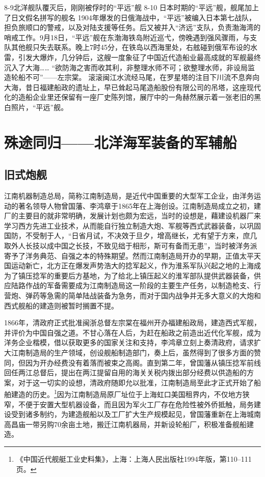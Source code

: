\documentclass[12pt,UTF8]{ctexbook}
\begin{document}
8-9北洋舰队覆灭后，刚刚被俘时的“平远”舰
8-10 日本时期的“平远”舰，舰尾加上了日文假名拼写的舰名
1904年爆发的日俄海战中，“平远”被编入日本第七战队，担负旅顺口的警戒，以及对陆支援等任务。后又被并入“济远”支队，负责渤海湾的哨戒工作。9月18日，“平远”舰在东渤海铁岛附近巡弋，傍晚遇到强风骤雨，与支队其他舰只失去联系。晚上7时45分，在铁岛以西海里处，右舷碰到俄军布设的水雷，引发大爆炸，几分钟后，这艘一度象征了中国近代造船业最高成就的军舰最终沉入了大海……
“欲防海之害而收其利，非整理水师不可；欲整理水师，非设局监造轮船不可”——左宗棠。
滚滚闽江水流经马尾，在罗星塔的注目下川流不息奔向大海，昔日福建船政的遗址上，早已耸起马尾造船股份有限公司的吊塔，这座现代化的造船企业里还保留有一座厂史陈列馆，展厅中的一角赫然展示着一张老旧的黑白照片，“平远”舰。

\chapter{殊途同归——北洋海军装备的军辅船}

\section{旧式炮舰}

江南机器制造总局，简称江南制造局，是近代中国重要的大型军工企业，由洋务运动的著名领导人物曾国藩、李鸿章于1865年在上海创设。江南制造局成立之初，建厂的主要目的就非常明确，发展计划也颇为宏远，当时的设想是，藉建设机器厂来学习西方先进工业技术，从而能自行独立制造大炮、军舰等西式武器装备，以巩固国防，不受制于人，“日省月试，不决效于旦夕，增高继长，尤有望于方来，庶几取外人长技以成中国之长技，不致见绌于相形，斯可有备而无患”，当时被洋务派寄予了洋务典范、自强之本的特殊期望。然而江南制造局开办的早期，正值太平天国运动新亡，北方正在爆发声势浩大的捻军起义，作为淮系军队兴起之地的上海成为了镇压捻军的重要后方基地，为了给北上镇压起义的淮军部队提供武器装备，供应陆路作战的军备需要成为江南制造局这一阶段的主要生产任务，以制造枪支、行营炮、弹药等急需的简单陆战装备为急务，而对于国内战争并无多大意义的大炮和西式舰船的建造则被暂时搁置不提。

1866年，清政府正式批准闽浙总督左宗棠在福州开办福建船政局，建造西式军舰，并评价为中国自强之道。不甘心落在人后，为赶在船政之前造出近代化军舰，成为洋务企业楷模，借以获取更多的国家关注和支持，李鸿章立刻上奏清政府，请求扩大江南制造局的生产领域，创设舰船制造部门，奏上后，虽然得到了很多方面的赞同，但因为开办经费没有着落而被束之高阁。直到第二年，曾国藩从镇压捻军前线回任两江总督后，提出在两江提留自用的海关关税内拨出部分经费以供造船的方案，对于这一切实的设想，清政府随即允以批准，江南制造局至此才正式开始了船舶建造的历史。\footnote{《中国近代舰艇工业史料集》，上海：上海人民出版社1994年版，第110--111页。}因为江南制造局原厂址位于上海虹口美国租界内，不仅地方狭窄，不便于安置大型机器设备，而且因为军火工厂存在危险性被外侨抵触，局务建设受到诸多制约，为建造舰船以及工厂扩大生产规模起见，曾国藩重新在上海城南高昌庙一带另购70余亩土地，搬迁江南机器局，并新设轮船厂，积极准备舰船建造。
\end{document}
